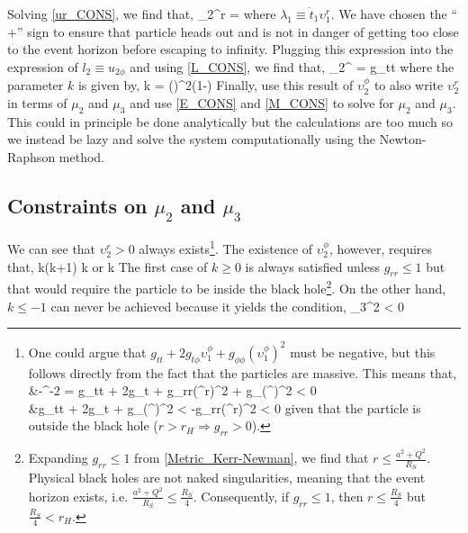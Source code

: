 Solving \eqref{ur_CONS}, we find that,
\be\label{v2r}
	\upsilon_{2}^{r} = 
\ee
where $\lambda_1 \equiv \dot{t}_1\upsilon_{1}^{r}$. We have chosen the ``$+$'' sign to ensure that particle heads out and is not in danger of getting too close to the event horizon before escaping to infinity. Plugging this expression into the expression of $l_2 \equiv u_{2\phi}$ and using \eqref{L_CONS}, we find that,
\be
	\upsilon_{2}^{\phi} = g_{tt} 
\ee
where the parameter $k$ is given by,
\be
	k = \left(\right)^2\left(1-\right)
\ee
Finally, use this result of $\upsilon_{2}^{\phi}$ to also write $\upsilon_{2}^{r}$ in terms of $\mu_2$ and $\mu_3$ and use \eqref{E_CONS} and \eqref{M_CONS} to solve for $\mu_2$ and $\mu_3$. This could in principle be done analytically but the calculations are too much so we instead be lazy and solve the system computationally using the Newton-Raphson method.

\subsection{Constraints on $\mu_2$ and $\mu_3$}
We can see that $\upsilon_{2}^{r}>0$ always exists\footnote{One could argue that $g_{tt}+2g_{t\phi}\upsilon_1^{\phi}+g_{\phi\phi}(\upsilon_{1}^{\phi})^2$ must be negative, but this follows directly from the fact that the particles are massive. This means that,
	\be\ba
		&-^{-2} = g_{tt} + 2g_{t\phi} + g_{rr}(\upsilon^{r})^2 + g_{\phi\phi}(\upsilon^{\phi})^2 < 0 \\
		&\Rightarrow g_{tt} + 2g_{t\phi} + g_{\phi\phi}(\upsilon^{\phi})^2 < -g_{rr}(\upsilon^{r})^2 < 0
	\ea\ee
given that the particle is outside the black hole ($r>r_{H}\Rightarrow g_{rr}>0$).}. The existence of $\upsilon_{2}^{\phi}$, however, requires that,
\be
	k(k+1)  \Rightarrow k \;\; or \;\; k
\ee
The first case of $k\ge0$ is always satisfied unless $g_{rr}\le1$ but that would require the particle to be inside the black hole\footnote{Expanding $g_{rr}\le1$ from \eqref{Metric_Kerr-Newman}, we find that $r\le\frac{a^2+Q^2}{R_{S}}$. Physical black holes are not naked singularities, meaning that the event horizon exists, i.e. $\frac{a^2+Q^2}{R_{S}}\le\frac{R_{S}}{4}$. Consequently, if $g_{rr}\le1$, then $r\le\frac{R_{S}}{4}$ but $\frac{R_{S}}{4}<r_{H}$.}. On the other hand, $k\le-1$ can never be achieved because it yields the condition,
\be
	\mu_3^2 \le {}  < 0
\ee


